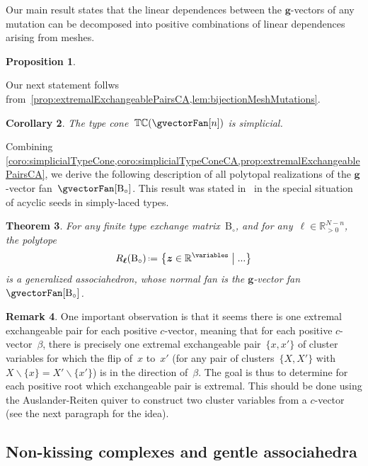 \documentclass{amsart}
\newtheorem{theorem}{Theorem}[section]
\newtheorem{corollary}[theorem]{Corollary}
\newtheorem{proposition}[theorem]{Proposition}
\theoremstyle{definition}
\newtheorem{remark}[theorem]{Remark}
\newcommand{\R}{\mathbb{R}} %
\renewcommand{\b}[1]{{\boldsymbol{#1}}} %
\newcommand{\set}[2]{\left\{ #1 \;\middle|\; #2 \right\}} %
\newcommand{\ssm}{\smallsetminus} %
\newcommand{\eqdef}{\mbox{\,\raisebox{0.2ex}{\scriptsize\ensuremath{\mathrm:}}\ensuremath{=}\,}} %
\newcommand{\typeCone}{\mathbb{TC}} %
\newcommand{\B}{\mathrm{B}} %
\begin{document}
Our main result states that the linear dependences between the $\b{g}$-vectors of any mutation can be decomposed into positive combinations of linear dependences arising from meshes.

\begin{proposition}
\label{prop:extremalExchangeablePairsCA}
\end{proposition}

Our next statement follws from~\cref{prop:extremalExchangeablePairsCA,lem:bijectionMeshMutations}.

\begin{corollary}
\label{coro:simplicialTypeConeCA}
The type cone~$\typeCone(\gvectorFan[n])$ is simplicial.
\end{corollary}

Combining \cref{coro:simplicialTypeCone,coro:simplicialTypeConeCA,prop:extremalExchangeablePairsCA}, we derive the following description of all polytopal realizations of the $\b{g}$-vector fan~$\gvectorFan[\B_\circ]$. This result was stated in~\cite{BazierMatteDouvilleMousavandThomasYildirim} in the special situation of acyclic seeds in simply-laced types.

\begin{theorem}
For any finite type exchange matrix~$\B_\circ$, and for any~$\b{\ell} \in \R_{>0}^{N-n}$, the polytope
\[
R_{\b{\ell}}(\B_\circ) \eqdef \set{\b{z} \in \R^{\variables}}{...}
\]
is a generalized associahedron, whose normal fan is the $\b{g}$-vector fan~$\gvectorFan[\B_\circ]$.
\end{theorem}


\newpage

\begin{remark}
One important observation is that it seems there is one extremal exchangeable pair for each positive $c$-vector, meaning that for each positive $c$-vector~$\beta$, there is precisely one extremal exchangeable pair~$\{x,x'\}$ of cluster variables for which the flip of~$x$ to~$x'$ (for any pair of clusters~$\{X,X'\}$ with~$X \ssm \{x\} = X' \ssm \{x'\}$) is in the direction of~$\beta$.
The goal is thus to determine for each positive root which exchangeable pair is extremal.
This should be done using the Auslander-Reiten quiver to construct two cluster variables from a $c$-vector (see the next paragraph for the idea).
\end{remark}

\newpage


\subsection{Non-kissing complexes and gentle associahedra}
\end{document}
